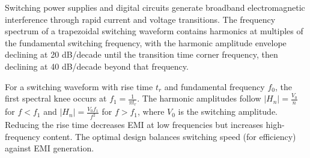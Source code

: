 \documentclass[11pt,a4paper]{article}
\begin{document}
Switching power supplies and digital circuits generate broadband electromagnetic interference through rapid current and voltage transitions. The frequency spectrum of a trapezoidal switching waveform contains harmonics at multiples of the fundamental switching frequency, with the harmonic amplitude envelope declining at 20 dB/decade until the transition time corner frequency, then declining at 40 dB/decade beyond that frequency.

For a switching waveform with rise time $t_r$ and fundamental frequency $f_0$, the first spectral knee occurs at $f_1 = \frac{1}{\pi t_r}$. The harmonic amplitudes follow $|H_n| = \frac{V_0}{n}$ for $f < f_1$ and $|H_n| = \frac{V_0 f_1}{f^2}$ for $f > f_1$, where $V_0$ is the switching amplitude. Reducing the rise time decreases EMI at low frequencies but increases high-frequency content. The optimal design balances switching speed (for efficiency) against EMI generation.
\end{document}
